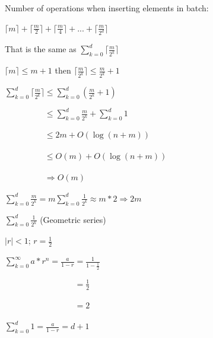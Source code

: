 \documentclass{article}
\begin{document}
Number of operations when inserting elements in batch:



$\lceil m \rceil + \lceil \frac{m}{2} \rceil + \lceil \frac{m}{4} \rceil + ... + \lceil \frac{m}{2^d} \rceil$



That is the same as $\sum_{k=0}^{d} \lceil \frac{m}{2^k} \rceil$



$\lceil m \rceil \leq m + 1$ then $\lceil \frac{m}{2^k} \rceil \leq \frac{m}{2^k} + 1$



$\sum_{k=0}^{d} \lceil \frac{m}{2^k} \rceil \leq \sum_{k=0}^{d} (\frac{m}{2^k} + 1)$




$\phantom{\sum_{k=0}^{d} \lceil \frac{m}{2^k} \rceil} \leq \sum_{k=0}^{d} \frac{m}{2^k} + \sum_{k=0}^{d} 1$



$\phantom{\sum_{k=0}^{d} \lceil \frac{m}{2^k} \rceil} \leq 2m + O(\log (n+m))$



$\phantom{\sum_{k=0}^{d} \lceil \frac{m}{2^k} \rceil} \leq O(m) + O(\log (n+m))$



$\phantom{\sum_{k=0}^{d} \lceil \frac{m}{2^k} \rceil} \Rightarrow \boxed{O(m)}$



$\sum_{k=0}^{d} \frac{m}{2^k} = m \sum_{k=0}^{d} \frac{1}{2^k} \approx m * 2 \Rightarrow 2m$



$\sum_{k=0}^{d} \frac{1}{2^k}$ (Geometric series)



$|r| < 1$; $r = \frac{1}{2}$



$\sum_{k=0}^{\infty} a * r ^ n = \frac{a}{1-r} = \frac{1}{1-\frac{1}{2}}$



$\phantom{\sum_{k=0}^{\infty} a * r ^ n = \frac{a}{1-r}} = \frac{1}{2}$



$\phantom{\sum_{k=0}^{\infty} a * r ^ n = \frac{a}{1-r}} = 2$



$\sum_{k=0}^{d} 1 = \frac{a}{1-r} = d + 1$
\end{document}
